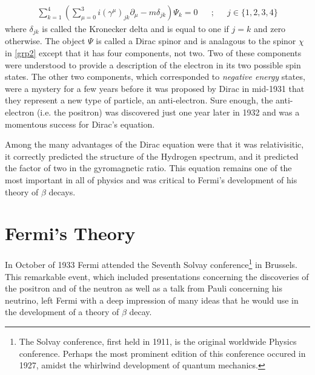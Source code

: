 \documentclass[12pt]{book}
\begin{document}
\begin{align}
\displaystyle\sum_{k = 1}^{4}\left(\displaystyle\sum_{\mu = 0}^{3}i(\gamma^{\mu})_{jk}\partial_{\mu}-m\delta_{jk} \right)\Psi_{k}=0 && ; && j\in\{1,2,3,4\}
\end{align}
where $\delta_{jk}$ is called the Kronecker delta and is equal to one if $j=k$ and zero otherwise. The object $\Psi$ is called a Dirac spinor and is analagous to the spinor $\chi$ in \ref{grp2} except that it has four components, not two. Two of these components were understood to provide a description of the electron in its two possible spin states. The other two components, which corresponded to \emph{negative energy} states, were a mystery for a few years before it was proposed by Dirac in mid-1931 that they represent a new type of particle, an anti-electron. Sure enough, the anti-electron (i.e. the positron) was discovered just one year later in 1932 and was a momentous success for Dirac's equation\cite{brandt}.

Among the many advantages of the Dirac equation were that it was relativisitic, it correctly predicted the structure of the Hydrogen spectrum, and it predicted the factor of two in the gyromagnetic ratio. This equation remains one of the most important in all of physics and was critical to Fermi's development of his theory of $\beta$ decays.

\section{Fermi's Theory}

In October of 1933 Fermi attended the Seventh Solvay conference\footnote{The Solvay conference, first held in 1911, is the original worldwide Physics conference. Perhaps the most prominent edition of this conference occured in 1927, amidst the whirlwind development of quantum mechanics.} in Brussels. This remarkable event, which included presentations concerning the discoveries of the positron and of the neutron as well as a talk from Pauli concerning his neutrino, left Fermi with a deep impression of many ideas that he would use in the development of a theory of $\beta$ decay.

\end{document}
